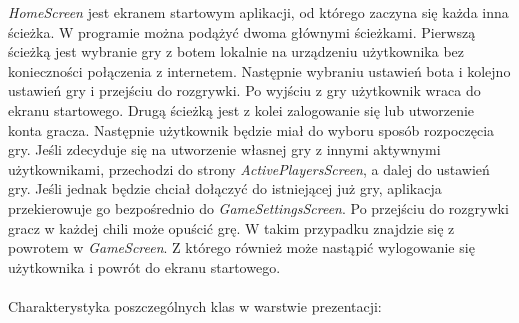 \emph{HomeScreen} jest ekranem startowym aplikacji, od którego zaczyna się każda inna ścieżka. W programie można podążyć dwoma głównymi ścieżkami. Pierwszą ścieżką jest wybranie gry z botem lokalnie na urządzeniu użytkownika bez konieczności połączenia z internetem. Następnie wybraniu ustawień bota i kolejno ustawień gry i przejściu do rozgrywki. Po wyjściu z gry użytkownik wraca do ekranu startowego. Drugą ścieżką jest z kolei zalogowanie się lub utworzenie konta gracza. Następnie użytkownik będzie miał do wyboru sposób rozpoczęcia gry. Jeśli zdecyduje się na utworzenie własnej gry z innymi aktywnymi użytkownikami, przechodzi do strony \emph{ActivePlayersScreen}, a dalej do ustawień gry. Jeśli jednak będzie chciał dołączyć do istniejącej już gry, aplikacja przekierowuje go bezpośrednio do \emph{GameSettingsScreen}. Po przejściu do rozgrywki gracz w każdej chili może opuścić grę. W takim przypadku znajdzie się z powrotem w \emph{GameScreen}. Z którego również może nastąpić wylogowanie się użytkownika i powrót do ekranu startowego. \\ \\ 
Charakterystyka poszczególnych klas w warstwie prezentacji:
